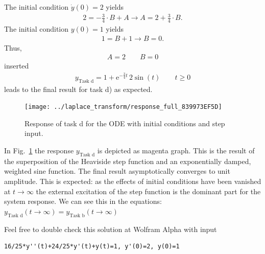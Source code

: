 \documentclass[11pt,a4paper,DIV=12]{scrartcl}
\begin{document}
The initial condition $\dot{y}(0) = 2$ yields
\begin{align}
2 = -\frac{3}{4}\cdot B + A \rightarrow A = 2 +  \frac{3}{4}\cdot B.
\end{align}
The initial condition ${y}(0) = 1$ yields
\begin{align}
1 = B  + 1 \rightarrow B = 0.
\end{align}
Thus,
\begin{align}
A = 2\qquad B = 0
\end{align}
inserted
\begin{align}
\boxed{
y_\text{Task d} =
1+\mathrm{e}^{-\frac{3}{4} t}
\, 2 \sin(t)\qquad t \geq 0
}
\end{align}
leads to the final result for task d) as expected.
%
\begin{figure}[b!]
\centering
\texttt{[image: ../laplace\_transform/response\_full\_839973EF5D]}
\caption{Response of task d for the ODE with initial conditions and step input.}
\label{fig:response_full}
\end{figure}
%
In Fig.~\ref{fig:response_full} the response $y_\text{Task d} $ is depicted as
magenta graph. This is the result of the superposition of the Heaviside step
function and an exponentially damped, weighted sine function.
The final result asymptotically converges to unit amplitude.
%
This is expected: as the effects of initial conditions have been vanished at $t\to\infty$
the external excitation of the step function is the dominant part for the system
response.
%
We can see this in the equations: $y_\text{Task d}(t\to\infty) = y_\text{Task b}(t\to\infty)$

Feel free to double check this solution at Wolfram Alpha with input
\begin{verbatim}
16/25*y''(t)+24/25*y'(t)+y(t)=1, y'(0)=2, y(0)=1
\end{verbatim}





\end{document}
